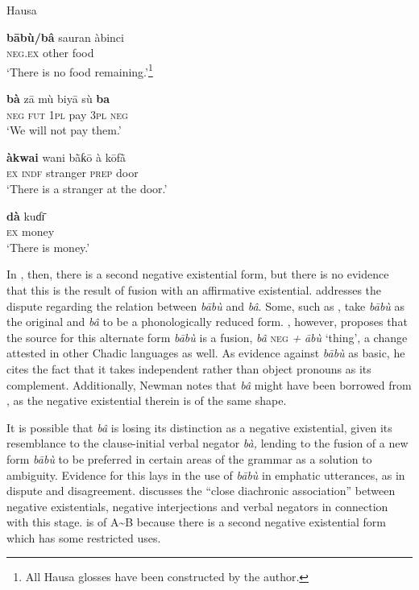 \documentclass[output=paper,draft,draftmode,colorlinks,citecolor=brown]{langscibook}
\begin{document}
%
\ea Hausa \citep[178--179, 357]{Newman2000}%
\\
\label{ex:hausa-remain-pay-stranger-money}

\ea \label{ex:hausa-remain}

\gll \textbf{bābù/bâ} sauran àbinci\\
  	\textsc{neg.ex} other food\\

\glt ‘There is no food remaining.’\footnote{All Hausa glosses have been constructed by the author.}
  \ex \label{ex:hausa-pay}

\gll \textbf{bà} zā mù biyā sù \textbf{ba}\\
  	\textsc{neg} \textsc{fut} 1\textsc{pl} pay 3\textsc{pl} \textsc{neg}\\

\glt `We will not pay them.'
  \ex \label{ex:hausa-stranger}

\gll \textbf{àkwai} wani bā̀ƙō à kōfā̀ \\
  	\textsc{ex} \textsc{indf} stranger \textsc{prep} door\\
\glt `There is a stranger at the door.'
  \ex \label{ex:hausa-money}

\gll \textbf{dà} kuɗɪ̄\\
  	\textsc{ex} money\\
\glt `There is money.'
\z
\z


In , then, there is a second negative existential form, but there is no evidence that this is the result of fusion with an affirmative existential. \citet{Newman2000} addresses the dispute regarding the relation between \textit{b\=abù} and \textit{bâ}. Some, such as \citet{Eulenberg1971}, take \textit{b\=abù} as the original and \textit{bâ} to be a phonologically reduced form.  \citet{Newman1971}, however, proposes that the source for this alternate form \textit{bābù} is a fusion, \textit{bâ} \textsc{neg} \textit{+} \textit{\=abù} `thing', a change attested in other Chadic languages as well. As evidence against \textit{b\=abù} as basic, he cites the fact that it takes independent rather than object pronouns as its complement. Additionally, Newman notes that \textit{bâ} might have been borrowed from , as the negative existential therein is of the same shape.

It is possible that \textit{bâ} is losing its distinction as a negative
existential, given its resemblance to the clause-initial verbal negator
\textit{bà,} lending to the fusion of a new form \textit{b\=abù} to be
preferred in certain areas of the grammar as a solution to ambiguity.
Evidence for this lays in the use of \textit{b\=abù} in emphatic
utterances, as in dispute and disagreement. \citet{Croft1991} discusses
the ``close diachronic association'' between negative existentials,
negative interjections and verbal negators in connection with this stage.
 is of A{\textasciitilde}B because there is a second negative
existential form which has some restricted uses.
\end{document}
